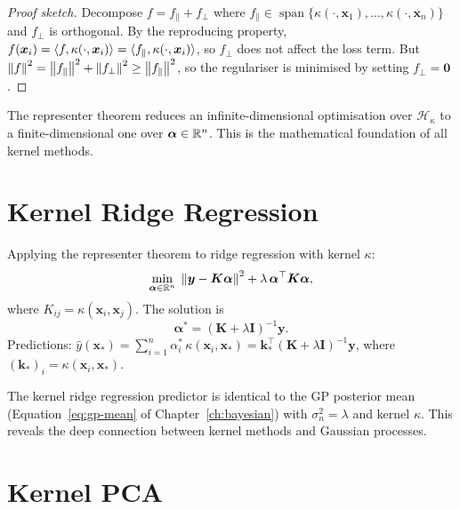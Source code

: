 \begin{proof}[Proof sketch]
Decompose $f=f_\parallel+f_\perp$ where $f_\parallel\in\operatorname{span}\{\kappa(\cdot,\bm{x}_1),\dots,\kappa(\cdot,\bm{x}_n)\}$ and $f_\perp$ is orthogonal. By the reproducing property, $f(\bm{x}_i)=\langle f, \kappa(\cdot,\bm{x}_i) \rangle=\langle f_\parallel, \kappa(\cdot,\bm{x}_i) \rangle$, so $f_\perp$ does not affect the loss term. But $\left\| f \right\|^2=\left\| f_\parallel \right\|^2+\left\| f_\perp \right\|^2\geq\left\| f_\parallel \right\|^2$, so the regulariser is minimised by setting $f_\perp=\bm{0}$.
\end{proof}

\begin{remark}
The representer theorem reduces an infinite-dimensional optimisation over $\mathcal{H}_\kappa$ to a finite-dimensional one over $\bm{\alpha}\in\mathbb{R}^n$. This is the mathematical foundation of all kernel methods.
\end{remark}

\section{Kernel Ridge Regression}

\begin{definition}
Applying the representer theorem to ridge regression with kernel $\kappa$:
\[
  \min_{\bm{\alpha}\in\mathbb{R}^n}\; \left\| \bm{y}-\bm{K}\bm{\alpha} \right\|^2 + \lambda\,\bm{\alpha}^\top\bm{K}\bm{\alpha},
\]
where $K_{ij}=\kappa(\bm{x}_i,\bm{x}_j)$. The solution is
\[
  \bm{\alpha}^* = (\bm{K}+\lambda\bm{I})^{-1}\bm{y}.
\]
Predictions: $\hat y(\bm{x}_*)=\sum_{i=1}^n\alpha_i^*\,\kappa(\bm{x}_i,\bm{x}_*)=\bm{k}_*^\top(\bm{K}+\lambda\bm{I})^{-1}\bm{y}$, where $(\bm{k}_*)_i=\kappa(\bm{x}_i,\bm{x}_*)$.
\end{definition}

\begin{proposition}
The kernel ridge regression predictor is identical to the GP posterior mean (Equation~\ref{eq:gp-mean} of Chapter~\ref{ch:bayesian}) with $\sigma_n^2=\lambda$ and kernel $\kappa$. This reveals the deep connection between kernel methods and Gaussian processes.
\end{proposition}

\section{Kernel PCA}

